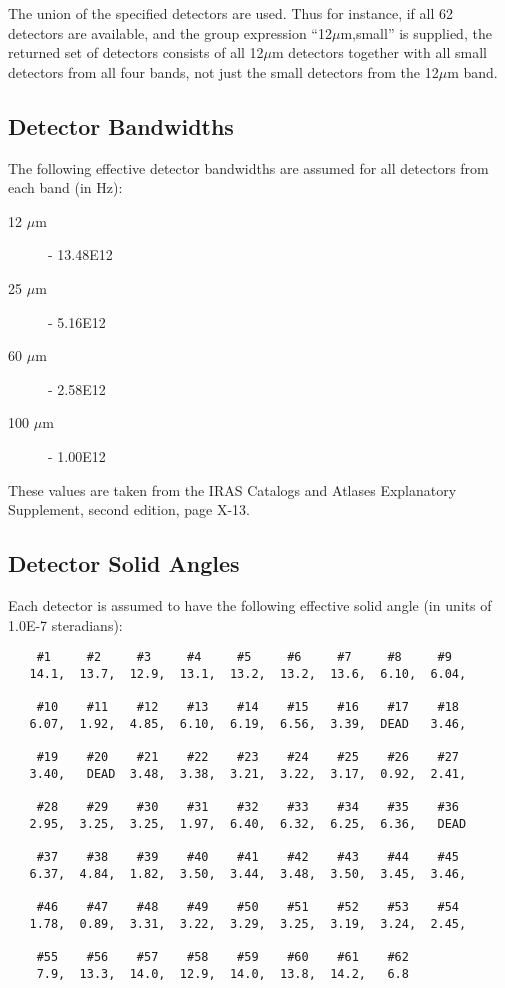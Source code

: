 The union of the specified detectors are used. Thus for instance,
if all 62 detectors are available, and the group expression
``12$\mu$m,small'' is supplied, the returned set of detectors consists
of all 12$\mu$m detectors together with all small detectors from all
four bands, not just the small detectors from the 12$\mu$m band.

\subsection{Detector Bandwidths}
\label{SEC:BWID}
The following effective detector bandwidths are assumed for
all detectors from each band (in Hz):
\begin{description}
\item [12 $\mu$m] - 13.48E12
\item [25 $\mu$m] - 5.16E12
\item [60 $\mu$m] - 2.58E12
\item [100 $\mu$m] - 1.00E12
\end{description}

These values are taken from the {\small IRAS} Catalogs and Atlases
Explanatory Supplement, second edition, page X-13.

\subsection{Detector Solid Angles}
\label{SEC:SOLAN}
Each detector is assumed to have the following effective solid
angle (in units of 1.0E-7 steradians):

\small
\begin{verbatim}
    #1     #2     #3     #4     #5     #6     #7     #8     #9
   14.1,  13.7,  12.9,  13.1,  13.2,  13.2,  13.6,  6.10,  6.04,

    #10    #11    #12    #13    #14    #15    #16    #17    #18
   6.07,  1.92,  4.85,  6.10,  6.19,  6.56,  3.39,  DEAD   3.46,

    #19    #20    #21    #22    #23    #24    #25    #26    #27
   3.40,   DEAD  3.48,  3.38,  3.21,  3.22,  3.17,  0.92,  2.41,

    #28    #29    #30    #31    #32    #33    #34    #35    #36
   2.95,  3.25,  3.25,  1.97,  6.40,  6.32,  6.25,  6.36,   DEAD

    #37    #38    #39    #40    #41    #42    #43    #44    #45
   6.37,  4.84,  1.82,  3.50,  3.44,  3.48,  3.50,  3.45,  3.46,

    #46    #47    #48    #49    #50    #51    #52    #53    #54
   1.78,  0.89,  3.31,  3.22,  3.29,  3.25,  3.19,  3.24,  2.45,

    #55    #56    #57    #58    #59    #60    #61    #62
    7.9,  13.3,  14.0,  12.9,  14.0,  13.8,  14.2,   6.8
\end{verbatim}
\normalsize

